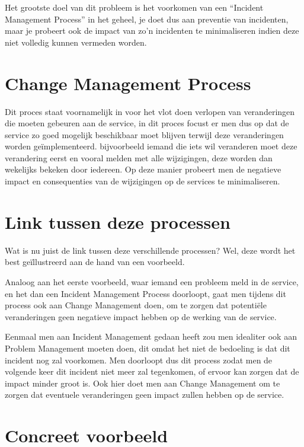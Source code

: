 \documentclass{article}
\begin{document}
	Het grootste doel van dit probleem is het voorkomen van een “Incident Management Process” in het geheel, je doet dus aan preventie van incidenten, maar je probeert ook de impact van zo’n incidenten te minimaliseren indien deze niet volledig kunnen vermeden worden. 
	
	\section{Change Management Process}
	
	Dit proces staat voornamelijk in voor het vlot doen verlopen van veranderingen die moeten gebeuren aan de service, in dit proces focust er men dus op dat de service zo goed mogelijk beschikbaar moet blijven terwijl deze veranderingen worden geïmplementeerd. bijvoorbeeld iemand die iets wil veranderen moet deze verandering eerst en vooral melden met alle wijzigingen, deze worden dan wekelijks bekeken door iedereen. Op deze manier probeert men de negatieve impact en consequenties van de wijzigingen op de services te minimaliseren.
	
	\section{Link tussen deze processen}
	Wat is nu juist de link tussen deze verschillende processen? Wel, deze wordt het best geïllustreerd aan de hand van een voorbeeld.\\
	
	\par
	\noindent
	Analoog aan het eerste voorbeeld, waar iemand een probleem meld in de service, en het dan een Incident Management Process doorloopt, gaat men tijdens dit process ook aan Change Management doen, om te zorgen dat potentiële veranderingen geen negatieve impact hebben op de werking van de service.\\
	
	\par
	\noindent
	Eenmaal men aan Incident Management gedaan heeft zou men idealiter ook aan Problem Management moeten doen, dit omdat het niet de bedoeling is dat dit incident nog zal voorkomen. Men doorloopt dus dit process zodat men de volgende keer dit incident niet meer zal tegenkomen, of ervoor kan zorgen dat de impact minder groot is. Ook hier doet men aan Change Management om te zorgen dat eventuele veranderingen geen impact zullen hebben op de service.
	
	\section{Concreet voorbeeld}

	\printbibliography
\end{document}
